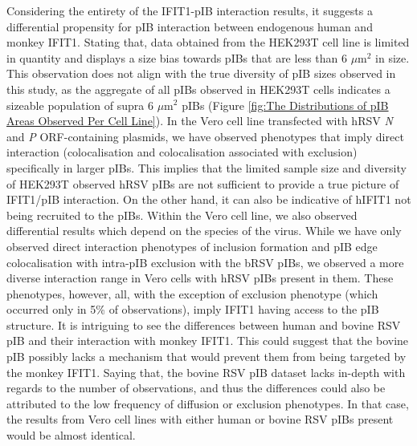Considering the entirety of the IFIT1-pIB interaction results, it suggests a differential propensity for pIB interaction between endogenous human and monkey IFIT1. Stating that, data obtained from the HEK293T cell line is limited in quantity and displays a size bias towards pIBs that are less than 6 \(\mu \mbox{m}^2\) in size. This observation does not align with the true diversity of pIB sizes observed in this study, as the aggregate of all pIBs observed in HEK293T cells indicates a sizeable population of supra 6 \(\mu \mbox{m}^2\) pIBs (Figure \ref{fig:The Distributions of pIB Areas Observed Per Cell Line}). In the Vero cell line transfected with hRSV \textit{N} and \textit{P} ORF-containing plasmids, we have observed phenotypes that imply direct interaction (colocalisation and colocalisation associated with exclusion) specifically in larger pIBs. This implies that the limited sample size and diversity of HEK293T observed hRSV pIBs are not sufficient to provide a true picture of IFIT1/pIB interaction. On the other hand, it can also be indicative of hIFIT1 not being recruited to the pIBs. Within the Vero cell line, we also observed differential results which depend on the species of the virus. While we have only observed direct interaction phenotypes of inclusion formation and pIB edge colocalisation with intra-pIB exclusion with the bRSV pIBs, we observed a more diverse interaction range in Vero cells with hRSV pIBs present in them. These phenotypes, however, all, with the exception of exclusion phenotype (which occurred only in 5\% of observations), imply IFIT1 having access to the pIB structure. It is intriguing to see the differences between human and bovine RSV pIB and their interaction with monkey IFIT1. This could suggest that the bovine pIB possibly lacks a mechanism that would prevent them from being targeted by the monkey IFIT1. Saying that, the bovine RSV pIB dataset lacks in-depth with regards to the number of observations, and thus the differences could also be attributed to the low frequency of diffusion or exclusion phenotypes. In that case, the results from Vero cell lines with either human or bovine RSV pIBs present would be almost identical.

